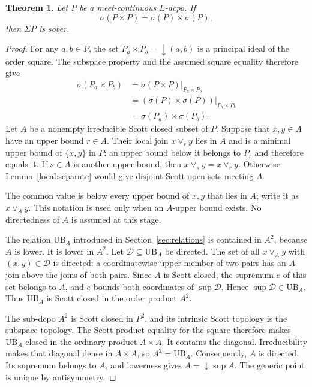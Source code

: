 \documentclass[10pt,a4paper]{article}
\newtheorem{theorem}{Theorem}[section]
\theoremstyle{definition}
\begin{document}
\begin{theorem}\label{local:sober}
Let $P$ be a meet-continuous $L$-dcpo. If
\[
 \sigma(P\times P)=\sigma(P)\times\sigma(P),
\]
then $\Sigma P$ is sober. %
\end{theorem}
\begin{proof}
For any $a,b\in P$, the set $P_a\times P_b={\downarrow}(a,b)$ is a principal ideal of the order square. The subspace property and the assumed square equality therefore give
\[
\begin{aligned}
 \sigma(P_a\times P_b)
 &=\left.\sigma(P\times P)\right|_{P_a\times P_b}\\
 &=\left.(\sigma(P)\times\sigma(P))\right|_{P_a\times P_b}\\
 &=\sigma(P_a)\times\sigma(P_b).
\end{aligned}
\]
Let $A$ be a nonempty irreducible Scott closed subset of $P$. Suppose that $x,y\in A$ have an upper bound $r\in A$. Their local join $x\vee_r y$ lies in $A$ and is a minimal upper bound of $\{x,y\}$ in $P$: an upper bound below it belongs to $P_r$ and therefore equals it. If $s\in A$ is another upper bound, then $x\vee_s y=x\vee_r y$. Otherwise Lemma~\ref{local:separate} would give disjoint Scott open sets meeting $A$.

The common value is below every upper bound of $x,y$ that lies in $A$; write it as $x\vee_A y$. This notation is used only when an $A$-upper bound exists. No directedness of $A$ is assumed at this stage.

The relation $\mathrm{UB}_A$ introduced in Section~\ref{sec:relations} is contained in $A^2$, because $A$ is lower. It is lower in $A^2$. Let $\mathcal D\subseteq\mathrm{UB}_A$ be directed. The set of all $x\vee_A y$ with $(x,y)\in\mathcal D$ is directed: a coordinatewise upper member of two pairs has an $A$-join above the joins of both pairs. Since $A$ is Scott closed, the supremum $e$ of this set belongs to $A$, and $e$ bounds both coordinates of $\sup\mathcal D$. Hence $\sup\mathcal D\in\mathrm{UB}_A$. Thus $\mathrm{UB}_A$ is Scott closed in the order product $A^2$.

The sub-dcpo $A^2$ is Scott closed in $P^2$, and its intrinsic Scott topology is the subspace topology. The Scott product equality for the square therefore makes $\mathrm{UB}_A$ closed in the ordinary product $A\times A$. It contains the diagonal. Irreducibility makes that diagonal dense in $A\times A$, so $A^2=\mathrm{UB}_A$. Consequently, $A$ is directed. Its supremum belongs to $A$, and lowerness gives $A={\downarrow}\sup A$. The generic point is unique by antisymmetry.
\end{proof}
\end{document}
